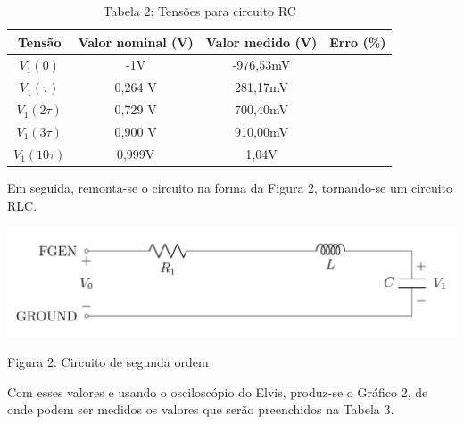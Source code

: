 \documentclass[a4 paper]{article}
\begin{document}
\vspace{5pt}
\begin{table}[h]
\centering
\begin{tabular}{|c|c|c|c|}
\hline
Tensão & Valor nominal (V) & Valor medido (V) & Erro (\%) \\\hline
$V_1(0)$ & -1V & -976,53mV & \\    \hline
$V_1(\tau)$ & 0,264 V & 281,17mV & \\    \hline
$V_1(2\tau)$ & 0,729 V & 700,40mV & \\\hline
$V_1(3\tau)$ & 0,900 V & 910,00mV & \\\hline
$V_1(10\tau)$ & 0,999V & 1,04V & \\\hline
\end{tabular}
\caption*{Tabela 2: Tensões para circuito RC}
\end{table}





Em seguida, remonta-se o circuito na forma da Figura 2, tornando-se um circuito RLC.

\begin{table}[h]
\centering
\includegraphics[scale=0.3]{figuras/figura3}
\end{table}

\begin{center}
Figura 2: Circuito de segunda ordem
\end{center}






Com esses valores e usando o osciloscópio do Elvis, produz-se o Gráfico 2, de onde podem ser medidos os valores que serão preenchidos na Tabela 3. 
\end{document}

